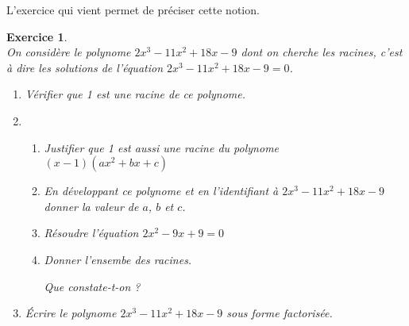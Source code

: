\documentclass[11pt,a4paper,french]{article}
\theoremstyle{break}
\theoremstyle{plain}
\newtheorem{exerciceT}{Exercice}
\theoremstyle{nonumberplain}
\theoremstyle{nonumberbreak}
\newenvironment{exercice}{\begin{framed}\begin{exerciceT}}{\end{exerciceT}\end{framed}}
\begin{document}
L'exercice qui vient permet de préciser cette notion.

\begin{exercice}~\\
  On considère le polynome $2 x^{3} - 11 x^{2} + 18 x - 9$ dont on
  cherche les racines, c'est à dire les solutions de l'équation $2 x^{3}
  - 11 x^{2} + 18 x - 9= 0$.
  \begin{enumerate}
    \item Vérifier que 1 est une racine de ce polynome.
    \item \begin{enumerate}
        \item Justifier que 1 est aussi une racine du polynome $(x - 1)
          (ax^2 + bx + c)$
        \item En développant ce polynome et en l'identifiant à $2 x^{3}
          - 11 x^{2} + 18 x - 9$ donner la valeur de $a$, $b$ et $c$.
        \item Résoudre l'équation $2 x^{2} - 9 x + 9 = 0$
        \item Donner l'ensembe des racines.

          Que constate-t-on ?
      \end{enumerate}
    \item Écrire le polynome $2 x^{3} - 11 x^{2} + 18 x - 9$ sous forme
      factorisée.
  \end{enumerate}
\end{exercice}
\end{document}
